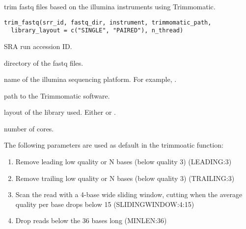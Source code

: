 \documentclass[letterpaper]{book}
\begin{document}
%
\begin{Description}\relax
{} trim fastq files based on the illumina instruments using Trimmomatic.
\end{Description}
%
\begin{Usage}
\begin{verbatim}
trim_fastq(srr_id, fastq_dir, instrument, trimmomatic_path,
  library_layout = c("SINGLE", "PAIRED"), n_thread)
\end{verbatim}
\end{Usage}
%
\begin{Arguments}
\begin{ldescription}
\item[\code{srr\_id}] SRA run accession ID.

\item[\code{fastq\_dir}] directory of the fastq files.

\item[\code{instrument}] name of the illumina sequencing platform. For example, .

\item[\code{trimmomatic\_path}] path to the Trimmomatic software.

\item[\code{library\_layout}] layout of the library used. Either  or .

\item[\code{n\_thread}] number of cores.
\end{ldescription}
\end{Arguments}
%
\begin{Details}\relax
The following parameters are used as default in the trimmoatic function:
\begin{enumerate}

\item Remove leading low quality or N bases (below quality 3) (LEADING:3)
\item Remove trailing low quality or N bases (below quality 3) (TRAILING:3)
\item Scan the read with a 4-base wide sliding window, cutting when the average quality per base drops below 15 (SLIDINGWINDOW:4:15)
\item Drop reads below the 36 bases long (MINLEN:36)

\end{enumerate}

\end{Details}
\end{document}
